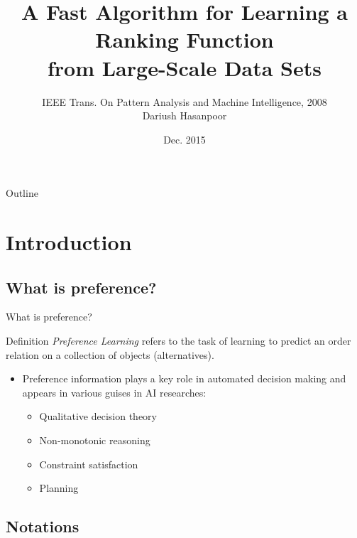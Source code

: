 \documentclass[8pt]{beamer}
\title[\scalebox{.68}{A Fast Algorithm for Learning a Ranking Function from Large-Scale Data Sets}]{A Fast Algorithm for Learning a Ranking Function\\from Large-Scale Data Sets}
\author[\scalebox{.8}{Dariush Hasanpoor}]{{\footnotesize IEEE Trans. On Pattern Analysis and Machine Intelligence, 2008}\\\vspace{3em}Dariush Hasanpoor}
\institute[]{Isfahan University Of Technology}
\date[Dec. 2015]{Dec. 2015}
\makeatletter
\newcommand{\Ytri}{$\triangleright$ }
\renewcommand{\|}[1][.3em]{\hspace{#1}|\hspace{#1}}
\renewcommand{\,}[1][.3em]{,\hspace{#1}}
\def\donotresetequations{{%
    \let\@@elt\relax
    \def\@elt##1{%
        \expandafter\ifx\csname ##1\endcsname\c@equation%
        \else%
            \@@elt {##1}%
        \fi%
    }%
    \edef\beamer@overlaycounterresets{\beamer@overlaycounterresets}%
    \let\@elt\relax%
    \def\@@elt{\@elt}%
    \xdef\beamer@overlaycounterresets{\beamer@overlaycounterresets}%
}}
\newlength{\wideitemsep}
\let\olditem\item
\renewcommand{\item}{\setlength{\itemsep}{\wideitemsep}\olditem}
\newcommand{\subitem}{\item[\Ytri]}
\newcommand{\Cpl}{\emph{Preference Learning} }
\renewcommand{\,}{,\hspace{3pt}}
\renewcommand{\|}{\hspace{3pt}|\hspace{3pt}}
\makeatother
\begin{document}
\donotresetequations

\begin{frame}
  \titlepage
\end{frame}

\begin{frame}{Outline}
  \tableofcontents[hideallsubsections]
\end{frame}

\section{Introduction}
\frame{\tableofcontents[currentsection]}
\subsection{What is preference?}

\begin{frame}{What is preference?}

	\begin{block}{Definition}
	\Cpl refers to the task of learning to predict an order relation on a collection of objects (alternatives).
	\end{block}
    \begin{itemize}
    \item Preference information plays a key role in automated decision making and appears in various guises in AI researches:
        \begin{itemize}
        \subitem Qualitative decision theory
        \subitem Non-monotonic reasoning
        \subitem Constraint satisfaction
        \subitem Planning
        \end{itemize}
    \end{itemize}
\end{frame}

\subsection{Notations}
\end{document}
